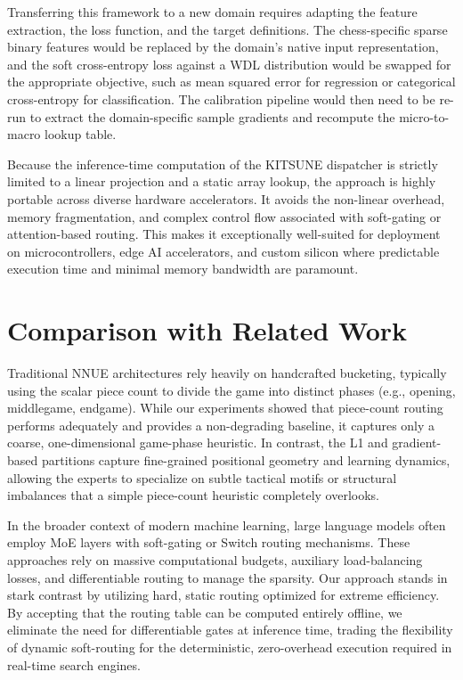 Transferring this framework to a new domain requires adapting the feature extraction, the loss function, and the target definitions. The chess-specific sparse binary features would be replaced by the domain's native input representation, and the soft cross-entropy loss against a WDL distribution would be swapped for the appropriate objective, such as mean squared error for regression or categorical cross-entropy for classification. The calibration pipeline would then need to be re-run to extract the domain-specific sample gradients and recompute the micro-to-macro lookup table.

Because the inference-time computation of the KITSUNE dispatcher is strictly limited to a linear projection and a static array lookup, the approach is highly portable across diverse hardware accelerators. It avoids the non-linear overhead, memory fragmentation, and complex control flow associated with soft-gating or attention-based routing. This makes it exceptionally well-suited for deployment on microcontrollers, edge AI accelerators, and custom silicon where predictable execution time and minimal memory bandwidth are paramount.

\section{Comparison with Related Work}
Traditional NNUE architectures rely heavily on handcrafted bucketing, typically using the scalar piece count to divide the game into distinct phases (e.g., opening, middlegame, endgame). While our experiments showed that piece-count routing performs adequately and provides a non-degrading baseline, it captures only a coarse, one-dimensional game-phase heuristic. In contrast, the L1 and gradient-based partitions capture fine-grained positional geometry and learning dynamics, allowing the experts to specialize on subtle tactical motifs or structural imbalances that a simple piece-count heuristic completely overlooks.

In the broader context of modern machine learning, large language models often employ MoE layers with soft-gating or Switch routing mechanisms. These approaches rely on massive computational budgets, auxiliary load-balancing losses, and differentiable routing to manage the sparsity. Our approach stands in stark contrast by utilizing hard, static routing optimized for extreme efficiency. By accepting that the routing table can be computed entirely offline, we eliminate the need for differentiable gates at inference time, trading the flexibility of dynamic soft-routing for the deterministic, zero-overhead execution required in real-time search engines.


